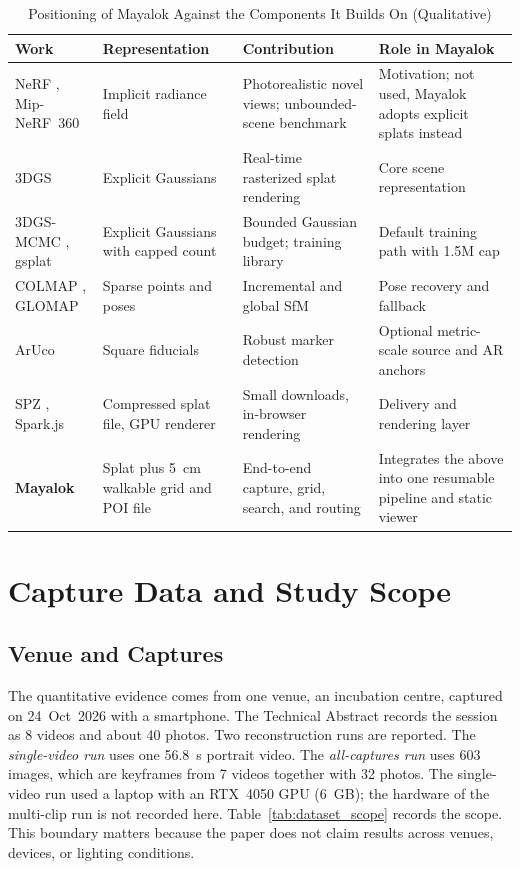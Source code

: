 \documentclass[conference]{IEEEtran}
\begin{document}
\begin{table}[!tb]
\centering
\footnotesize
\caption{Positioning of Mayalok Against the Components It Builds On (Qualitative)}
\label{tab:positioning}
\begin{tabular}{p{}p{}p{}p{}}
\toprule
\textbf{Work} & \textbf{Representation} & \textbf{Contribution} & \textbf{Role in Mayalok} \\
\midrule
NeRF \cite{mildenhall2020nerf}, Mip-NeRF~360 \cite{barron2022mipnerf360} & Implicit radiance field & Photorealistic novel views; unbounded-scene benchmark & Motivation; not used, Mayalok adopts explicit splats instead \\
3DGS \cite{kerbl2023} & Explicit Gaussians & Real-time rasterized splat rendering & Core scene representation \\
3DGS-MCMC \cite{kheradmand2024mcmc}, gsplat \cite{ye2024gsplat} & Explicit Gaussians with capped count & Bounded Gaussian budget; training library & Default training path with 1.5M cap \\
COLMAP \cite{schonberger2016sfm}, GLOMAP \cite{pan2024glomap} & Sparse points and poses & Incremental and global SfM & Pose recovery and fallback \\
ArUco \cite{garridojurado2014aruco} & Square fiducials & Robust marker detection & Optional metric-scale source and AR anchors \\
SPZ \cite{spz2025}, Spark.js \cite{spark2025} & Compressed splat file, GPU renderer & Small downloads, in-browser rendering & Delivery and rendering layer \\
\textbf{Mayalok} & Splat plus 5~cm walkable grid and POI file & End-to-end capture, grid, search, and routing & Integrates the above into one resumable pipeline and static viewer \\
\bottomrule
\end{tabular}
\end{table}

\section{Capture Data and Study Scope}
\subsection{Venue and Captures}
The quantitative evidence comes from one venue, an incubation centre, captured on 24~Oct~2026 with a smartphone. The Technical Abstract records the session as 8 videos and about 40 photos. Two reconstruction runs are reported. The \emph{single-video run} uses one 56.8~s portrait video. The \emph{all-captures run} uses 603 images, which are keyframes from 7 videos together with 32 photos. The single-video run used a laptop with an RTX~4050 GPU (6~GB); the hardware of the multi-clip run is not recorded here. Table~\ref{tab:dataset_scope} records the scope. This boundary matters because the paper does not claim results across venues, devices, or lighting conditions.
\end{document}
